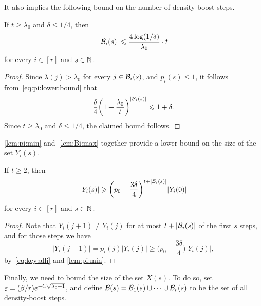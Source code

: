 It also implies the following bound on the number of density-boost steps. 
%
\begin{lemma}
  \label{lem:Bi:max} %
  If \(t \ge \lambda_0\) and \(\delta \le 1/4\), then
  \begin{equation*}
    |\mathcal{B}_i(s)| \leqslant \frac{4 \log(1/\delta)}{\lambda_0} \cdot t
  \end{equation*}
  for every \(i \in [r]\) and \(s \in \mathbb{N}\). 
\end{lemma}
%
\begin{proof}
  Since \(\lambda(j) > \lambda_0\) for every \(j \in \mathcal{B}_i(s)\), and \(p_i(s) \le 1\), it follows from~\eqref{eq:pi:lower:bound} that
  \begin{equation*}
    \frac{\delta}{4} \bigg( 1 + \frac{\lambda_0}{t} \bigg)^{|\mathcal{B}_i(s)|} \leqslant 1 + \delta.
  \end{equation*}
  Since \(t \ge \lambda_0\) and \(\delta \le 1/4\), the claimed bound follows. 
\end{proof}

\autoref{lem:pi:min} and~\autoref{lem:Bi:max} together provide a lower bound on the size of the set \(Y_i(s)\). 

\begin{lemma}
  \label{lem:Y:lower:bound} %
  If \(t \ge 2\), then
  \begin{equation*}
    |Y_i(s)| \geqslant \bigg( p_0 - \frac{3\delta}{4} \bigg)^{t + |\mathcal{B}_i(s)|} |Y_i(0)|
  \end{equation*}
  for every \(i \in [r]\) and \(s \in \mathbb{N}\). 
\end{lemma}
%
\begin{proof}
  Note that \(Y_i(j+1) \ne Y_i(j)\) for at most \(t + |\mathcal{B}_i(s)|\) of the first \(s\) steps, and for those steps we have
  \begin{equation*}
    |Y_i(j+1)| = p_i(j) |Y_i(j)| \ge \bigg( p_0 - \frac{3\delta}{4} \bigg) |Y_i(j)|,
  \end{equation*}
  by~\eqref{eq:key:alli} and \autoref{lem:pi:min}.
\end{proof}

Finally, we need to bound the size of the set \(X(s)\). To do so, set \(\varepsilon = (\beta / r) e^{- C \sqrt{\lambda_0 + 1}}\), and define \(\mathcal{B}(s) = \mathcal{B}_1(s) \cup \cdots \cup \mathcal{B}_r(s)\) to be the set of all density-boost steps. 

